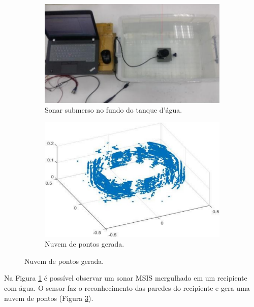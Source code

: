 \begin{figure}[H]
    \centering
    \caption{Nuvem de pontos gerada a partir de dados coletados por um sonar MSIS.}
    \label{fig:point_cloud_example}
    \begin{subfigure}[t]{0.32\textwidth}
        \includegraphics[width=\textwidth]{dados/figuras/point_cloud_example_tank.png}
        \caption{Sonar submerso no fundo do tanque d'água.}
        \label{fig:point_cloud_example_a}
    \end{subfigure}
    \hspace{3em}
    \begin{subfigure}[t]{0.32\textwidth}
        \includegraphics[width=\textwidth]{dados/figuras/point_cloud_example.png}
        \caption{Nuvem de pontos gerada.}
        \label{fig:point_cloud_example_b}
    \end{subfigure}
\end{figure}

Na Figura \ref{fig:point_cloud_example_a} é possível observar um sonar MSIS mergulhado em um recipiente com água.
O sensor faz o reconhecimento das paredes do recipiente e gera uma nuvem de pontos (Figura \ref{fig:point_cloud_example_b}).


